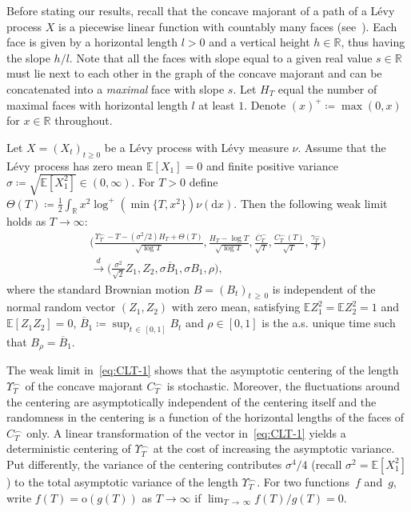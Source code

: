 \documentclass[AHL,Unicode,longabstracts,published]{cedram}
\newcommand\R{\mathbb{R}}
\newcommand\E{\mathds{E}}
\newcommand\1{\mathds{1}}
\newcommand\D{\mathrm{d}}
\newcommand\oh{\mathrm{o}}
\newcommand\cid{\xrightarrow{d}}
\newcommand\ov[1]{\overline{#1}}
\begin{document}
Before stating our results, recall that the concave majorant of a path of a Lévy process $X$ is a piecewise linear function with countably many faces (see~\cite[Theorem~11]{CM_Fluctuation_Levy}). Each face is given by a horizontal length $l>0$ and a vertical height $h\in\R$, thus having the slope $h/l$. Note that all the faces with slope equal to a given real value $s\in\R$ must lie next to each other in the graph of the concave majorant and can be concatenated into a \emph{maximal} face with slope $s$. Let $H_T$ equal the number of maximal faces with horizontal length $l$ at least $1$. Denote $(x)^+\coloneqq\max(0,x)$ for $x\in\R$ throughout.


\begin{theo}\label{thm:maintheorem1}
Let $X=(X_t)_{t\ge 0}$ be a Lévy process with Lévy measure $\nu$. Assume that the Lévy process has zero mean $\E [X_1]=0$ and finite positive variance $\sigma\coloneqq\sqrt{\E[X_1^2]}\in(0,\infty)$. For $T>0$ define $\Theta(T)\coloneqq \frac{1}{2}
\int_\R x^2\log^+(\min\{T,x^2\})\nu(\D x)$. Then the following weak limit holds as $T\to\infty$:
\begin{equation}\label{eq:CLT-1}
\begin{multlined}
\bigg(
\frac{\Upsilon_T^{\frown} -T-\left(\sigma^2/2\right)H_T +\Theta(T)}{\sqrt{\log T}},
\frac{H_T-\log T}{\sqrt{\log T}},
\frac{\ov{C}^\frown_T}{\sqrt{T}},
\frac{C^\frown_T(T)}{\sqrt{T}},
\frac{\gamma^\frown_T}{T}
\bigg)\\
\cid
\Big(
\tfrac{\sigma^2}{\sqrt{2}}Z_1, Z_2,
\sigma\ov B_1,
\sigma B_1,
\rho
\Big),
\end{multlined}
\end{equation}
where the standard Brownian motion $B=(B_t)_{t\,\geq\,0}$ is independent of the normal random vector $(Z_1,Z_2)$ with zero mean, satisfying $\E Z_1^2=\E Z_2^2=1$ and $\E [Z_1Z_2]=0$, $\ov B_1\coloneqq\sup_{t\,\in\,[0,1]}B_t$ and $\rho\in[0,1]$ is the a.s. unique time such that $B_\rho=\ov B_1$.
\end{theo}

The weak limit in~\eqref{eq:CLT-1} shows that the asymptotic centering of the length $\Upsilon_T^\frown$ of the concave majorant $C^\frown_T$ is stochastic. Moreover, the fluctuations around the centering are asymptotically independent of the centering itself and the randomness in the centering is a function of the horizontal lengths of the faces of $C^\frown_T$ only. A linear transformation of the vector in~\eqref{eq:CLT-1} yields a deterministic centering of $\Upsilon_T^\frown$ at the cost of increasing the asymptotic variance. Put differently, the variance of the centering contributes $\sigma^4/4$ (recall $\sigma^2=\E [X_1^2]$) to the total asymptotic variance of the length $\Upsilon_T^\frown$. For two functions~$f$ and~$g$, write $f(T)=\oh(g(T))$ as $T\to\infty$ if $\lim_{T\,\to\,\infty}f(T)/g(T)=0$.
\end{document}

